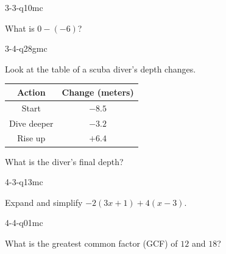 \begin{practiceQuestion}{3-3-q10}{mc}
\begin{questionText}
What is $0 - (-6)$?
\end{questionText}
\end{practiceQuestion}

\begin{practiceQuestion}{3-4-q28}{gmc}
\begin{questionText}
Look at the table of a scuba diver's depth changes.

\begin{center}
\begin{tabular}{|c|c|}
\hline
\textbf{Action} & \textbf{Change (meters)} \\
\hline
Start & $-8.5$ \\
\hline
Dive deeper & $-3.2$ \\
\hline
Rise up & $+6.4$ \\
\hline
\end{tabular}
\end{center}

What is the diver's final depth?
\end{questionText}
\end{practiceQuestion}

\begin{practiceQuestion}{4-3-q13}{mc}
\begin{questionText}
Expand and simplify $-2(3x + 1) + 4(x - 3)$.
\end{questionText}
\end{practiceQuestion}

\begin{practiceQuestion}{4-4-q01}{mc}
\begin{questionText}
What is the greatest common factor (GCF) of $12$ and $18$?
\end{questionText}
\end{practiceQuestion}

